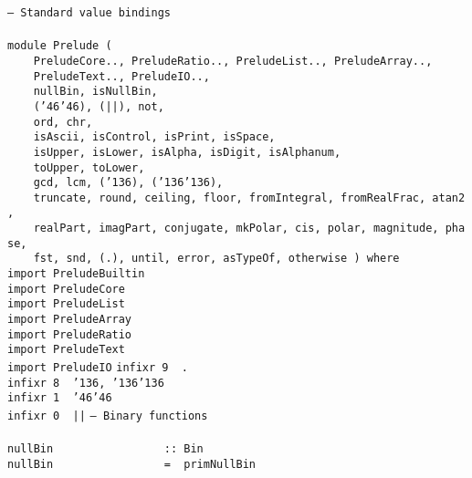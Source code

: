 \noindent\bprogB
\mbox{\tt --\ Standard\ value\ bindings}\\
\mbox{\tt }\\
\mbox{\tt module\ Prelude\ (}\\
\mbox{\tt \ \ \ \ PreludeCore..,\ PreludeRatio..,\ PreludeList..,\ PreludeArray..,\ }\\
\mbox{\tt \ \ \ \ PreludeText..,\ PreludeIO..,\ }\\
\mbox{\tt \ \ \ \ nullBin,\ isNullBin,}\\
\mbox{\tt \ \ \ \ ({\char'46}{\char'46}),\ (||),\ not,}\\
\mbox{\tt \ \ \ \ ord,\ chr,\ }\\
\mbox{\tt \ \ \ \ isAscii,\ isControl,\ isPrint,\ isSpace,\ }\\
\mbox{\tt \ \ \ \ isUpper,\ isLower,\ isAlpha,\ isDigit,\ isAlphanum,}\\
\mbox{\tt \ \ \ \ toUpper,\ toLower,}\\
\mbox{\tt \ \ \ \ gcd,\ lcm,\ ({\char'136}),\ ({\char'136}{\char'136}),\ }\\
\mbox{\tt \ \ \ \ truncate,\ round,\ ceiling,\ floor,\ fromIntegral,\ fromRealFrac,\ atan2,}\\
\mbox{\tt \ \ \ \ realPart,\ imagPart,\ conjugate,\ mkPolar,\ cis,\ polar,\ magnitude,\ phase,}\\
\mbox{\tt \ \ \ \ fst,\ snd,\ (.),\ until,\ error,\ asTypeOf,\ otherwise\ )\ where}
\eprogB\noindent\bprogB
\mbox{\tt import\ PreludeBuiltin}\\
\mbox{\tt import\ PreludeCore}\\
\mbox{\tt import\ PreludeList}\\
\mbox{\tt import\ PreludeArray}\\
\mbox{\tt import\ PreludeRatio}\\
\mbox{\tt import\ PreludeText}\\
\mbox{\tt import\ PreludeIO}
\eprogB\noindent\bprogB
\mbox{\tt infixr\ 9\ \ .}\\
\mbox{\tt infixr\ 8\ \ {\char'136},\ {\char'136}{\char'136}}\\
\mbox{\tt infixr\ 1\ \ {\char'46}{\char'46}}\\
\mbox{\tt infixr\ 0\ \ ||}
\eprogB\noindent\bprogB
\mbox{\tt --\ Binary\ functions}\\
\mbox{\tt }\\
\mbox{\tt nullBin\ \ \ \ \ \ \ \ \ \ \ \ \ \ \ \ \ ::\ Bin}\\
\mbox{\tt nullBin\ \ \ \ \ \ \ \ \ \ \ \ \ \ \ \ \ =\ \ primNullBin}
